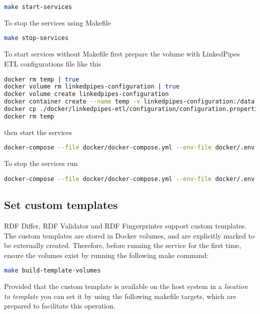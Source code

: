 \begin{lstlisting}[language=bash,]
make start-services
\end{lstlisting}

	To stop the services using Makefile
	
\begin{lstlisting}[language=bash,]
make stop-services
\end{lstlisting}		

	To start services without Makefile first prepare the volume with LinkedPipes ETL configurations file like this
	
\begin{lstlisting}[language=bash,]
docker rm temp | true
docker volume rm linkedpipes-configuration | true
docker volume create linkedpipes-configuration
docker container create --name temp -v linkedpipes-configuration:/data busybox
docker cp ./docker/linkedpipes-etl/configuration/configuration.properties temp:/data
docker rm temp
\end{lstlisting}		

	then start the services
	
\begin{lstlisting}[language=bash,]
docker-compose --file docker/docker-compose.yml --env-file docker/.env up -d
\end{lstlisting}

	To stop the services run

\begin{lstlisting}[language=bash,]
docker-compose --file docker/docker-compose.yml --env-file docker/.env down
\end{lstlisting}


	\subsection{Set custom templates}
 
	 RDF Differ, RDF Validator and RDF Fingerprinter support custom templates. The custom templates are stored in Docker volumes, and are explicitly marked to be externally created. Therefore, before running the service for the first time, ensure the volumes exist by running the following make command:

\begin{lstlisting}[language=bash,]
make build-template-volumes
\end{lstlisting}	 
	 	 
	 Provided that the custom template is available on the host system in a \textit{location to template} you can set it by using the following makefile targets, which are prepared to facilitate this operation. 
	 
